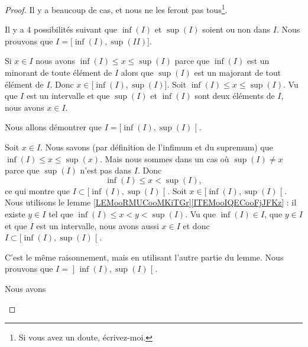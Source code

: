 \begin{proof}
	Il y a beaucoup de cas, et nous ne les feront pas tous\footnote{Si vous avez un doute, écrivez-moi.}.
	\begin{subproof}
		Il y a 4 possibilités suivant que \( \inf(I)\) et \( \sup(I)\) soient ou non dans \( I\).
		Nous prouvons que \( I=\mathopen[ \inf(I) , \sup(II) \mathclose]\).
		\begin{subproof}
			Si \( x\in I\) nous avons \( \inf(I)\leq x\leq \sup(I)\) parce que \( \inf(I)\) est un minorant de toute élément de \( I\) alors que \( \sup(I)\) est un majorant de tout élément de \( I\). Donc \( x\in \mathopen[ \inf(I) , \sup(I) \mathclose]\).
			Soit \( \inf(I)\leq x\leq \sup(I)\). Vu que \( I\) est un intervalle et que \( \sup(I)\) et \( \inf(I)\) sont deux éléments de \( I\), nous avons \( x\in I\).
		\end{subproof}
		Nous allons démontrer que \( I=\mathopen[ \inf(I) , \sup(I) \mathclose[\).
				\begin{subproof}
					Soit \( x\in I\). Nous savons (par définition de l'infimum et du supremum) que \( \inf(I)\leq x\leq \sup(x)\). Mais nous sommes dans un cas où \( \sup(I)\neq x\) parce que \( \sup(I)\) n'est pas dans \( I\). Donc
					\begin{equation}
						\inf(I)\leq x<\sup(I),
					\end{equation}
					ce qui montre que \( I\subset \mathopen[ \inf(I) , \sup(I) \mathclose[\).
					Soit \( x\in\mathopen[ \inf(I) , \sup(I) \mathclose[\). Nous utilisons le lemme \ref{LEMooRMUCooMKiTGr}\ref{ITEMooIQECooFjJFKz} : il existe \( y\in I\) tel que \( \inf(I)\leq x<y<\sup(I)\). Vu que \( \inf(I)\in I\), que \( y\in I\) et que \( I\) est un intervalle, nous avons aussi \( x\in I\) et donc \( I\subset \mathopen[ \inf(I) , \sup(I) \mathclose[\).
				\end{subproof}
				C'est le même raisonnement, mais en utilisant l'autre partie du lemme.
				Nous prouvons que \( I=\mathopen] \inf(I) , \sup(I) \mathclose[\).
				\begin{subproof}
					\spitem[Dans un sens]
					Nous avons
					\begin{equation}

\end{equation}
\end{subproof}
\end{subproof}
\end{proof}
